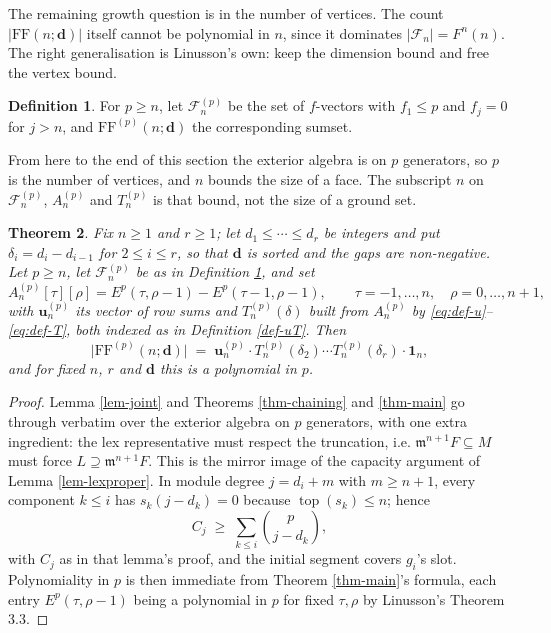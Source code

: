 \documentclass[11pt, a4paper, abstract=yes]{scrartcl}
\theoremstyle{definition}
\newtheorem{definition}{Definition}
\theoremstyle{remark}
\theoremstyle{plain}
\newtheorem{theorem}[definition]{Theorem}
\newcommand{\vek}[1]{\boldsymbol{#1}}
\newcommand{\tp}{\operatorname{top}}
\begin{document}
The remaining growth question is in the number of vertices. The count \(|\mathrm{FF}(n;\vek d)|\) itself
cannot be polynomial in \(n\), since it dominates \(|\mathcal F_n|=F^n(n)\). The right generalisation
is Linusson's own: keep the dimension bound and free the vertex bound.

\begin{definition}
For \(p\ge n\), let \(\mathcal F_n^{(p)}\) be the set of \(f\)-vectors with \(f_1\le p\) and
\(f_j=0\) for \(j>n\), and \(\mathrm{FF}^{(p)}(n;\vek d)\) the corresponding sumset.

From here to the end of this section the exterior algebra is on \(p\) generators, so \(p\) is the
number of vertices, and \(n\) bounds the size of a face. The subscript \(n\) on
\(\mathcal F_n^{(p)}\), \(A^{(p)}_n\) and \(T^{(p)}_n\) is that bound, not the size of a ground set.
\label{def-twoparam}
\end{definition}

\begin{theorem}
Fix \(n\ge1\) and \(r\ge1\); let \(d_1\le\cdots\le d_r\) be integers and put
\(\delta_i=d_i-d_{i-1}\) for \(2\le i\le r\), so that \(\vek d\) is sorted and the gaps are
non-negative. Let \(p\ge n\), let \(\mathcal F_n^{(p)}\) be as in Definition \ref{def-twoparam}, and set
\begin{equation}\label{eq:Ap}
  A^{(p)}_n[\tau][\rho]=E^p(\tau,\rho-1)-E^p(\tau-1,\rho-1),
  \qquad \tau=-1,\dots,n,\quad\rho=0,\dots,n+1,
\end{equation}
with \(\vek u^{(p)}_n\) its vector of row sums and \(T^{(p)}_n(\delta)\) built from \(A^{(p)}_n\) by
\eqref{eq:def-u}--\eqref{eq:def-T}, both indexed as in Definition \ref{def-uT}. Then
\begin{equation}\label{eq:auto-20}
  \lvert\mathrm{FF}^{(p)}(n;\vek d)\rvert\;=\;\vek u^{(p)}_n\cdot T^{(p)}_n(\delta_2)\cdots T^{(p)}_n(\delta_r)\cdot\vek 1_n ,
\end{equation}
and for fixed \(n\), \(r\) and \(\vek d\) this is a polynomial in \(p\).
\label{thm-poly-p}
\end{theorem}

\begin{proof}
Lemma \ref{lem-joint} and Theorems \ref{thm-chaining} and \ref{thm-main} go through verbatim over the exterior
algebra on \(p\) generators, with one extra ingredient: the lex representative must respect the
truncation, i.e. \(\mathfrak m^{n+1}F\subseteq M\) must force \(L\supseteq\mathfrak m^{n+1}F\). This
is the mirror image of the capacity argument of Lemma \ref{lem-lexproper}. In module degree
\(j=d_i+m\) with \(m\ge n+1\), every component \(k\le i\) has \(s_k(j-d_k)=0\) because
\(\tp(s_k)\le n\); hence
\[
  C_j\;\ge\;\sum_{k\le i}\binom p{j-d_k},
\]
with \(C_j\) as in that lemma's proof, and the initial segment covers
\(g_i\)'s slot. Polynomiality in \(p\) is then immediate from Theorem \ref{thm-main}'s formula, each
entry \(E^p(\tau,\rho-1)\) being a polynomial in \(p\) for fixed \(\tau,\rho\) by Linusson's
Theorem 3.3.
\end{proof}
\end{document}
